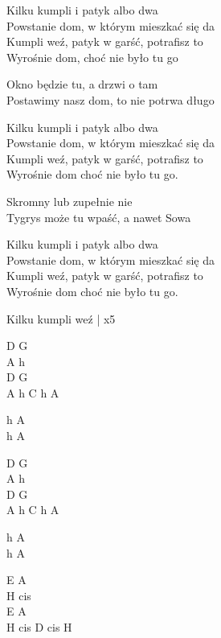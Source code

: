\begin{text}
    Kilku kumpli i patyk albo dwa\\
    Powstanie dom, w którym mieszkać się da\\
    Kumpli weź, patyk w garść, potrafisz to\\
    Wyrośnie dom, choć nie było tu go
    
	Okno będzie tu, a drzwi o tam\\
    Postawimy nasz dom, to nie potrwa długo
    
	Kilku kumpli i patyk albo dwa\\
    Powstanie dom, w którym mieszkać się da\\
    Kumpli weź, patyk w garść, potrafisz to\\
    Wyrośnie dom choć nie było tu go.
	
    Skromny lub zupełnie nie\\
    Tygrys może tu wpaść, a nawet Sowa
	
    Kilku kumpli i patyk albo dwa\\
    Powstanie dom, w którym mieszkać się da\\
    Kumpli weź, patyk w garść, potrafisz to\\
    Wyrośnie dom choć nie było tu go.
	
	Kilku kumpli weź | x5
\end{text}
\begin{chord}
    D G\\
	A h\\
	D G\\
	A h C h A
	
	h A\\
	h A
	
    D G\\
	A h\\
	D G\\
	A h C h A
	
	h A\\
	h A
	
	E A\\
	H cis\\
	E A\\
	H cis D cis H
\end{chord}